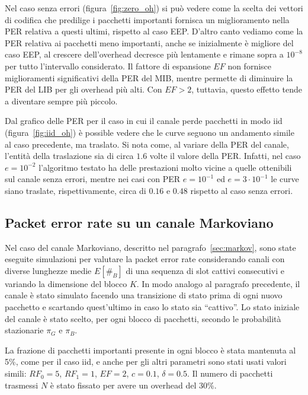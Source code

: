 \documentclass[italian, a4paper, 12pt]{article}
\begin{document}
Nel caso senza errori (figura~\ref{fig:zero_oh}) si può vedere come la
scelta dei vettori di codifica che predilige i pacchetti importanti
fornisca un miglioramento nella PER relativa a questi ultimi, rispetto
al caso EEP.
%
D'altro canto vediamo come la PER relativa ai pacchetti meno
importanti, anche se inizialmente è migliore del caso EEP, al crescere
dell'overhead decresce più lentamente e rimane sopra a $10^{-8}$ per
tutto l'intervallo considerato.
%
Il fattore di espansione $EF$ non fornisce miglioramenti significativi
della PER del MIB, mentre permette di diminuire la PER del LIB per gli
overhead più alti. Con $EF > 2$, tuttavia, questo effetto tende a
diventare sempre più piccolo.

Dal grafico delle PER per il caso in cui il canale perde pacchetti in
modo iid (figura~\ref{fig:iid_oh}) è possible vedere che le curve
seguono un andamento simile al caso precedente, ma traslato.
Si nota come, al variare della PER del canale, l'entità della traslazione
sia di circa $1.6$ volte il valore della PER.
%
Infatti, nel caso $e = 10^{-2}$ l'algoritmo testato ha delle
prestazioni molto vicine a quelle ottenibili sul canale senza errori,
mentre nei casi con PER $e = 10^{-1}$ ed $e = 3\cdot 10^{-1}$ le curve
siano traslate, rispettivamente, circa di $0.16$ e $0.48$ rispetto al
caso senza errori.

\subsection{Packet error rate su un canale Markoviano}
Nel caso del canale Markoviano, descritto nel
paragrafo~\ref{sec:markov}, sono state eseguite simulazioni per
valutare la packet error rate considerando canali con diverse
lunghezze medie $E[\#_B]$ di una sequenza di slot cattivi consecutivi
e variando la dimensione del blocco $K$.
%
In modo analogo al paragrafo precedente, il canale è stato simulato
facendo una transizione di stato prima di ogni nuovo pacchetto e
scartando quest'ultimo in caso lo stato sia ``cattivo''. Lo stato
iniziale del canale è stato scelto, per ogni blocco di pacchetti,
secondo le probabilità stazionarie $\pi_G$ e $\pi_B$.

La frazione di pacchetti importanti presente in ogni blocco è stata
mantenuta al 5\%, come per il caso iid, e anche per gli altri
parametri sono stati usati valori simili: $RF_0 = 5$, $RF_1 = 1$,
$EF=2$, $c=0.1$, $\delta=0.5$. Il numero di pacchetti trasmessi $N$ è
stato fissato per avere un overhead del 30\%.
\end{document}
